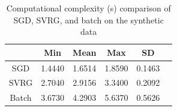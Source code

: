\documentclass[letterpaper]{article}
\begin{document}
		\begin{table}[ht]
			\centering
			\begin{tabular}{c||c c c c c }
				\hline
						& Min 	 & Mean  	& Max 		& SD 	    \\ \hline \hline
				SGD 	& 1.4440 & 1.6514 	& 1.8590 	& 0.1463    \\ \hline
				SVRG 	& 2.7040 & 2.9156 	& 3.3400 	& 0.2092 	\\   \hline
				Batch 	& 3.6730 & 4.2903 	& 5.6370 	& 0.5626	\\   \hline
			\end{tabular}
			\caption{Computational complexity (s) comparison of SGD, SVRG, and batch on the synthetic data}\label{tabl1}
		\end{table}
\end{document}
